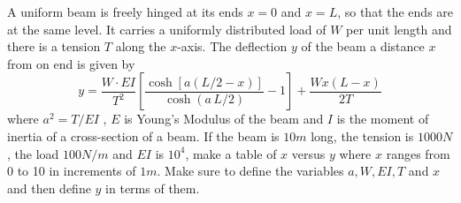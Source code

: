 {A uniform beam is freely hinged at its ends $x = 0$ and $x = L$, so that the ends are at the same level.  It carries a uniformly distributed load of $W$ per unit length and there is a tension $T$ along the $x$-axis.  The deflection $y$ of the beam a distance $x$ from on end is given by
\[
y = \frac{W \cdot EI}{T^2}\left[ \frac{\cosh\left[ a (L/2 - x)\right]}{\cosh(a\, L/2)} - 1 \right] 
+
\frac{W x(L-x)}{2T}
\]
where $a^2= T/EI$ , $E$ is Young's Modulus of the beam and $I$ is the moment of inertia of a cross-section of a beam.  If the beam is $10 m$ long, the tension is $1000N$, the load $100 N/m$ and $EI$ is $10^4$, make a table of $x$ versus $y$ where $x$ ranges from 0 to 10 in increments of $1 m$.  Make sure to define the variables $a, W, EI, T$ and $x$ and then define $y$ in terms of them.}
{}
